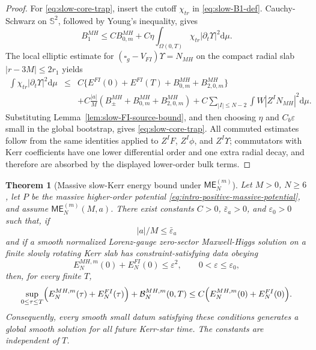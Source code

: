 \documentclass[11pt]{article}
\numberwithin{equation}{section}
\theoremstyle{plain}
\newtheorem{theorem}{Theorem}[section]
\theoremstyle{definition}
\theoremstyle{remark}
\newcommand{\dd}{\mathrm{d}}
\newcommand{\ME}{\mathsf{ME}}
\begin{document}
\begin{proof}
For \eqref{eq:slow-core-trap}, insert the cutoff \(\chi_{tr}\) in \eqref{eq:slow-B1-def}.  Cauchy-Schwarz on \(\mathbb S^2\), followed by Young's inequality, gives
\begin{equation}
B_1^{MH}\le C B_{0,m}^{MH}
+C\eta\int_{\Omega(0,T)}\chi_{tr}|\partial_t\Upsilon|^2\dd\mu.
\end{equation}
The local elliptic estimate for \((\square_g-V_{FI})\Upsilon=N_{MH}\) on the compact radial slab \(|r-3M|\le2r_1\) yields
\begin{eqnarray}
\int\chi_{tr}|\partial_t\Upsilon|^2\dd\mu
&\le&
C\{E^{FI}(0)+E^{FI}(T)+B_{0,m}^{MH}+B_{2,0,m}^{MH}\}
\nonumber\\
&&+C\frac{|a|}{M}(B_{\pm}^{MH}+B_{0,m}^{MH}+B_{2,0,m}^{MH})
+C\sum_{|I|\le N-2}\int W|Z^IN_{MH}|^2\dd\mu.
\end{eqnarray}
Substituting Lemma~\ref{lem:slow-FI-source-bound}, and then choosing \(\eta\) and \(C_b\varepsilon\) small in the global bootstrap, gives \eqref{eq:slow-core-trap}.  All commuted estimates follow from the same identities applied to \(Z^IF\), \(Z^I\phi\), and \(Z^I\Upsilon\); commutators with Kerr coefficients have one lower differential order and one extra radial decay, and therefore are absorbed by the displayed lower-order bulk terms.
\end{proof}


\begin{theorem}[Massive slow-Kerr energy bound under \(\ME^{(m)}_N\)]\label{thm:slow-kerr-massive-energy}
Let \(M>0\), \(N\ge6\), let \(P\) be the massive higher-order potential \eqref{eq:intro-positive-massive-potential}, and assume \(\ME^{(m)}_N(M,a)\).  There exist constants \(C>0\), \(\bar\varepsilon_a>0\), and \(\varepsilon_0>0\) such that, if
\begin{equation}
 |a|/M\le \bar\varepsilon_a
\end{equation}
and if a smooth normalized Lorenz-gauge zero-sector Maxwell-Higgs solution on a finite slowly rotating Kerr slab has constraint-satisfying data obeying
\begin{equation}
E_{N}^{MH,m}(0)+E_N^{FI}(0)\le \varepsilon^2,
\qquad
0<\varepsilon\le\varepsilon_0,
\end{equation}
then, for every finite \(T\),
\begin{equation}\label{eq:slow-kerr-massive-energy-bound-main}
\sup_{0\le\tau\le T}
\Bigl(E_{N}^{MH,m}(\tau)+E_N^{FI}(\tau)\Bigr)
+\mathcal B_{N}^{MH,m}(0,T)
\le
C\Bigl(E_{N}^{MH,m}(0)+E_N^{FI}(0)\Bigr).
\end{equation}
Consequently, every smooth small datum satisfying these conditions generates a global smooth solution for all future Kerr-star time.  The constants are independent of \(T\).
\end{theorem}
\end{document}
